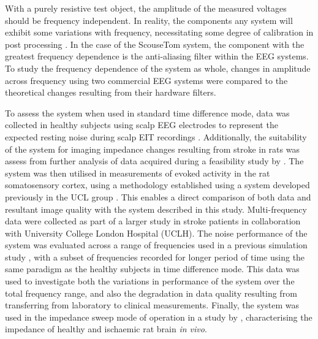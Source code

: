 With a purely resistive test object, the amplitude of the measured voltages should be frequency independent. In reality, the components any system will exhibit some variations with frequency, necessitating some degree of calibration in post processing \cite{Hun_Wi_2014,McEwan_2006}. In the case of the ScouseTom system, the component with the greatest frequency dependence is the anti-aliasing filter within the EEG systems. To study the frequency dependence of the system as whole, changes in amplitude across frequency using two commercial EEG systems were compared to the theoretical changes resulting from their hardware filters. 

To assess the system when used in standard time difference mode, data was collected in healthy subjects using scalp EEG electrodes to represent the expected resting noise during scalp EIT recordings \cite{Fabrizi_2006,fabrizi2007analysis,Romsauerova2006}. Additionally, the suitability of the system for imaging impedance changes resulting from stroke in rats was assess from further analysis of data acquired during a feasibility study by \citet{Dowrick_2016}. The system was then utilised in measurements of evoked activity in the rat somatosensory cortex, using a methodology established using a system developed previously in the UCL group \cite{Oh2011,Aristovich_2016}. This enables a direct comparison of both data and resultant image quality with the system described in this study. Multi-frequency data were collected as part of a larger study in stroke patients in collaboration with University College London Hospital (UCLH). The noise performance of the system was evaluated across a range of frequencies used in a previous simulation study \cite{Malone2014a}, with a subset of frequencies recorded for longer period of time using the same paradigm as the healthy subjects in time difference mode. This data was used to investigate both the variations in performance of the system over the total frequency range, and also the degradation in data quality resulting from transferring from laboratory to clinical measurements. Finally, the system was used in the impedance sweep mode of operation in a study by \citet{Dowrick_2015}, characterising the impedance of healthy and ischaemic rat brain \emph{in vivo}. 




